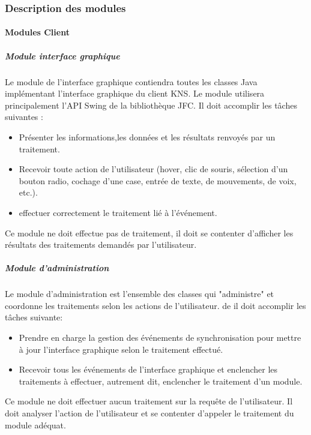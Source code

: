 \documentclass[10pt,a4paper]{report}
\begin{document}
		\subsubsection{Description des modules}
	
			\paragraph{Modules Client}

				\subparagraph{Module interface graphique}
				\begin{flushleft}
				Le module de l'interface graphique contiendra toutes les classes Java implémentant l'interface graphique du client KNS. Le module utilisera principalement l'API Swing de la bibliothèque JFC. Il doit  accomplir les tâches suivantes :\\
					
					\begin{itemize}
						\item Présenter les informations,les données et les résultats renvoyés par un traitement.
						\item Recevoir toute action de l'utilisateur (hover, clic de souris, sélection d'un bouton radio, cochage d'une case, entrée de texte, de mouvements, de voix, etc.).
						\item effectuer correctement le traitement lié à l'événement. 
					\end{itemize}
					
					Ce module ne doit effectue pas de traitement, il doit se contenter d'afficher les résultats des traitements demandés par l'utilisateur.\\
				\end{flushleft}
						
				\subparagraph{Module d'administration}
				
				\begin{flushleft}
				Le module d'administration est l'ensemble des classes qui "administre" et coordonne les traitements selon les actions de l'utilisateur. de  il doit accomplir les tâches suivante:
				
				\begin{itemize}
					\item Prendre en charge la gestion des événements de synchronisation pour mettre à jour l'interface graphique selon le traitement effectué. 
					\item Recevoir tous les événements de l'interface graphique et enclencher les traitements à effectuer, autrement dit, enclencher le traitement d'un module.
				\end{itemize}
				
Ce module ne doit effectuer aucun traitement sur la requête de l'utilisateur. Il doit analyser l'action de l'utilisateur et se contenter d'appeler le traitement du module adéquat.
				\end{flushleft}
				
\end{document}
